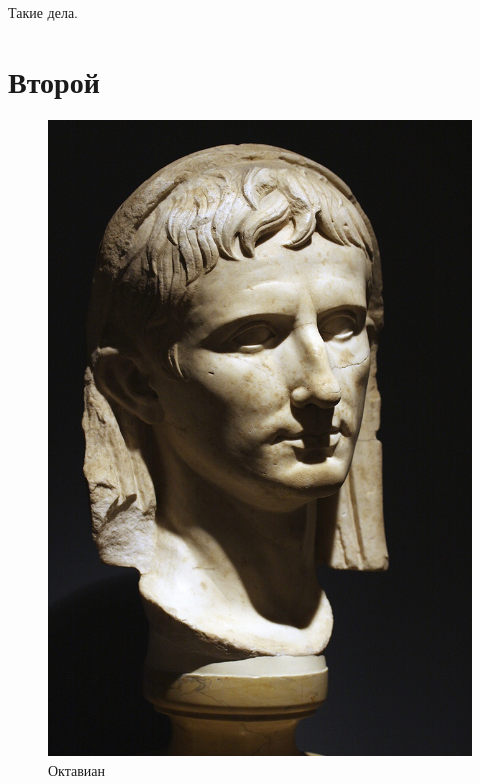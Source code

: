 Такие дела.

\section{Второй}

\begin{figure}[h!tb] 
	\centering\includegraphics[scale=0.3]{VoprosOtvet/1585820685158259604.png}
	\caption{Октавиан}%
\end{figure}	

